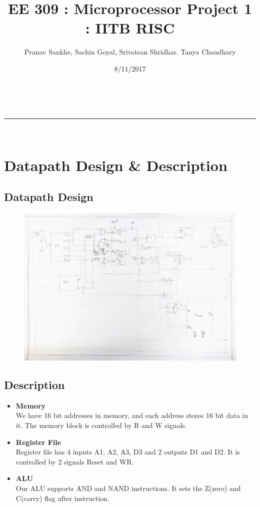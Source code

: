 \documentclass[a4paper,11pt]{article}
\makeatletter
\newcommand{\linia}{\rule{\linewidth}{0.5pt}}
\theoremstyle{mytheor}
\renewcommand{\maketitle}{
\begin{center}
\vspace{2ex}
{\huge \textsc{\@title}}
\vspace{1ex}
\\
\linia\\
\@author \hfill \@date
\vspace{4ex}
\end{center}
}
\makeatother
\begin{document}
\title{EE 309 : Microprocessor Project 1 : IITB RISC}

\author{Pranav Sankhe, Sachin Goyal, Srivatsan Shridhar, Tanya Chaudhary}

\date{8/11/2017}

\maketitle


\section{Datapath Design \& Description}

\subsection{Datapath Design}
\begin{figure}[h!]
  \includegraphics[width=\linewidth]{micro.jpg}
  \label{fig:result1}
\end{figure}

\subsection{Description}

\begin{itemize}
\item \textbf{Memory}\\
We have 16 bit addresses in memory, and each address stores 16 bit data in it. The memory block is controlled by R and W signals.   
\item \textbf{Register File}\\
Register file has 4 inputs A1, A2, A3, D3 and 2 outputs D1 and D2. It is controlled by 2 signals Reset and WR. 
\item \textbf{ALU}\\ 
Our ALU supports AND and NAND instructions. It sets the Z(zero) and C(carry) flag after instruction.  

\end{itemize}
\end{document}
